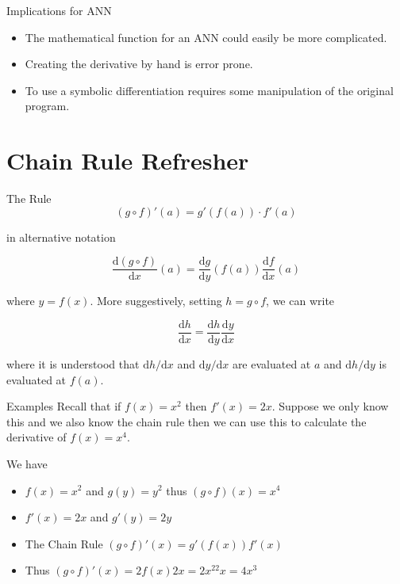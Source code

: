 \documentclass{beamer}
\begin{document}
\begin{frame}[fragile]{Implications for ANN}
\begin{itemize}
\item
The mathematical function for an ANN could easily be more
complicated.
\item
Creating the derivative by hand is error prone.
\item
To use a symbolic differentiation requires some manipulation of the
original program.
\end{itemize}
\end{frame}

\section{Chain Rule Refresher}

\begin{frame}[fragile]{The Rule}
$$
(g \circ f)'(a) = g'(f(a))\cdot f'(a)
$$

in alternative notation

$$
\frac{\mathrm{d} (g \circ f)}{\mathrm{d} x}(a) =
\frac{\mathrm{d} g}{\mathrm{d} y}(f(a)) \frac{\mathrm{d} f}{\mathrm{d} x}(a)
$$

where $y = f(x)$. More suggestively, setting $h = g \circ f$, we can write

$$
\frac{\mathrm{d} h}{\mathrm{d} x} =
\frac{\mathrm{d} h}{\mathrm{d} y} \frac{\mathrm{d} y}{\mathrm{d} x}
$$

where it is understood that $\mathrm{d} h / \mathrm{d} x$ and
$\mathrm{d} y / \mathrm{d} x$ are evaluated at $a$ and $\mathrm{d} h /
\mathrm{d} y$ is evaluated at $f(a)$.
\end{frame}

\begin{frame}[fragile]{Examples}
Recall that if $f(x) = x^2$ then $f'(x) = 2x$. Suppose we only know
this and we also know the chain rule then we can use this to calculate
the derivative of $f(x) = x^4$.

We have
\begin{itemize}
\item
$f(x) = x^2$ and $g(y) = y^2$ thus $(g \circ f)(x) = x^4$
\item
$f'(x) = 2x$ and $g'(y) = 2y$
\item
The Chain Rule $(g \circ f)'(x) = g'(f(x))f'(x)$
\item
Thus $(g \circ f)'(x) = 2f(x)2x = 2x^22x = 4x^3$
\end{itemize}
\end{frame}
\end{document}
